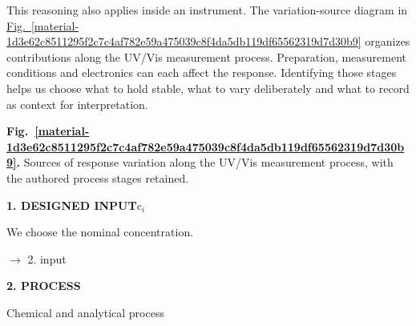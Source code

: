 \documentclass[11pt,a4paper]{article}
\begin{document}
\begin{center}
\end{center}

\medskip

This reasoning also applies inside an instrument. The variation-source diagram in \hyperref[material-1d3e62c8511295f2c7c4af782e59a475039c8f4da5db119df65562319d7d30b9]{Fig.~\ref*{material-1d3e62c8511295f2c7c4af782e59a475039c8f4da5db119df65562319d7d30b9}} organizes contributions along the UV/Vis measurement process. Preparation, measurement conditions and electronics can each affect the response. Identifying those stages helps us choose what to hold stable, what to vary deliberately and what to record as context for interpretation.


\par\medskip
\Needspace{10cm}
\label{material-1d3e62c8511295f2c7c4af782e59a475039c8f4da5db119df65562319d7d30b9}
\noindent\textbf{Fig.~\ref*{material-1d3e62c8511295f2c7c4af782e59a475039c8f4da5db119df65562319d7d30b9}.} Sources of response variation along the UV/Vis measurement process, with the authored process stages retained.\par\nopagebreak
\par\medskip\noindent\textcolor{pcd1}{\textbf{1. DESIGNED INPUT}}\quad c\ensuremath{{}_i}\par
We choose the nominal concentration.

\par\noindent $\longrightarrow$ 2. input
\par\medskip\noindent\textcolor{pcd2}{\textbf{2. PROCESS}}\par
Chemical and analytical process
\end{document}
